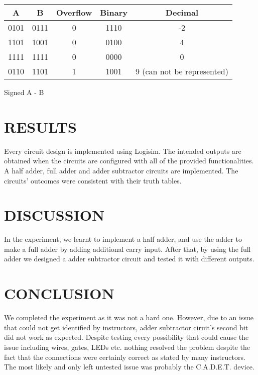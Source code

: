 \documentclass[pdftex,12pt,a4paper]{article}
\theoremstyle{plain}
\begin{document}
        \begin{center}
            \vspace{0.3cm}
            \begin{tabular}{c c | c c c}
                A & B & Overflow & Binary & Decimal \\
                \hline 
                0101 & 0111 & 0 & 1110 & -2\\
                1101 & 1001 & 0 & 0100 & 4\\
                1111 & 1111 & 0 & 0000 & 0\\
                0110 & 1101 & 1 & 1001 & 9 (can not be represented)\\
            \end{tabular}
            \vspace{0.3cm}
        \end{center}
        {\centering Signed A - B\\}
        
\newpage
\section{RESULTS}
Every circuit design is implemented using Logisim. The intended outputs are obtained when the circuits are configured with all of the provided functionalities. A half adder, full adder and adder subtractor circuits are implemented. The circuits' outcomes were consistent with their truth tables.

\section{DISCUSSION}
In the experiment, we learnt to implement a half adder, and use the adder to make a full adder by adding additional carry input. After that, by using the full adder we designed a adder subtractor circuit and tested it with different outputs.
\section{CONCLUSION}
We completed the experiment as it was not a hard one. However, due to an issue that could not get identified by instructors, adder subtractor ciruit's second bit did not work as expected. Despite testing every possibility that could cause the issue including wires, gates, LEDs etc. nothing resolved the problem despite the fact that the connections were certainly correct as stated by many instructors. The most likely and only left untested issue was probably the  C.A.D.E.T. device.
\end{document}
